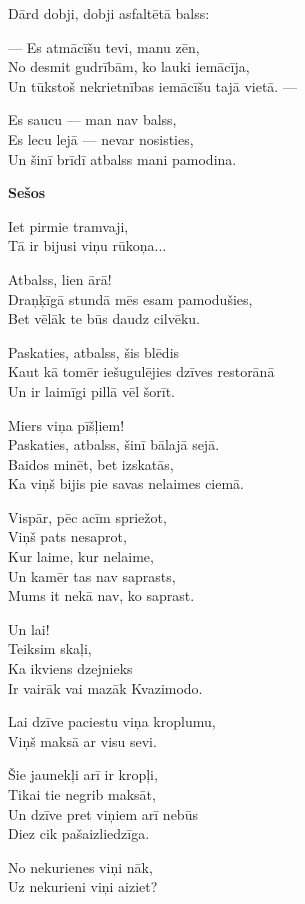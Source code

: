 \documentclass[14pt]{extarticle}
\begin{document}
Dārd dobji, dobji asfaltētā balss:

--- Es atmācīšu tevi, manu zēn,\\
No desmit gudrībām, ko lauki iemācīja,\\
Un tūkstoš nekrietnības iemācīšu tajā vietā. ---

Es saucu --- man nav balss,\\
Es lecu lejā --- nevar nosisties,\\
Un šinī brīdī atbalss mani pamodina.



\newpage

{\bf Sešos}

Iet pirmie tramvaji,\\
Tā ir bijusi viņu rūkoņa...

Atbalss, lien ārā!\\
Draņķīgā stundā mēs esam pamodušies,\\
Bet vēlāk te būs daudz cilvēku.

Paskaties, atbalss, šis blēdis\\
Kaut kā tomēr iešugulējies dzīves restorānā\\
Un ir laimīgi pillā vēl šorīt.

Miers viņa pīšļiem!\\
Paskaties, atbalss, šinī bālajā sejā.\\
Baidos minēt, bet izskatās,\\
Ka viņš bijis pie savas nelaimes ciemā.

Vispār, pēc acīm spriežot,\\
Viņš pats nesaprot,\\
Kur laime, kur nelaime,\\
Un kamēr tas nav saprasts,\\
Mums it nekā nav, ko saprast.

Un lai!\\
Teiksim skaļi,\\
Ka ikviens dzejnieks\\
Ir vairāk vai mazāk Kvazimodo.

Lai dzīve paciestu viņa kroplumu,\\
Viņš maksā ar visu sevi.

Šie jaunekļi arī ir kropļi,\\
Tikai tie negrib maksāt,\\
Un dzīve pret viņiem arī nebūs\\
Diez cik pašaizliedzīga.

No nekurienes viņi nāk,\\
Uz nekurieni viņi aiziet?
\end{document}
